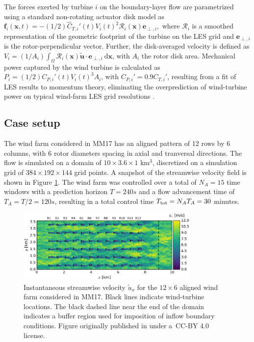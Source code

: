 \documentclass[wes, manuscript]{copernicus}
\newcommand{\bs}[1]{\boldsymbol{#1}}
\newcommand{\dx}{\text{d}\boldsymbol{x}}
\newcommand{\sint}{\int_{\Omega}}
\newcommand{\utilde}{\widetilde{\bs{u}}}
\newcommand{\R}{\mathscr{R}}
\newcommand{\eperpi}{\bs{e}_{\perp,i}}
\begin{document}
The forces exerted by turbine $i$ on the boundary-layer flow are parametrized using a standard non-rotating actuator disk model as
$	\bs{f}_i(\bs{x},t) = - (1/2) \widehat{C}_{T,i}'(t) V_i(t)^2 \R_i (\bs{x}) \eperpi,$
where $\R_i$ is a smoothed representation of the geometric footprint of the turbine on the LES grid and $\eperpi$ is the rotor-perpendicular vector. Further, the disk-averaged velocity is defined as $V_i = (1/A_i) \sint \R_i(\bs{x}) \utilde \cdot \eperpi ~\dx$, with $A_i$ the rotor disk area. Mechanical power captured by the wind turbine is calculated as $P_i = (1/2) C_{P,i}'(t) V_i(t)^3 A_i$, with $C_{P,i}' = 0.9 C_{T,i}'$, resulting from a fit of LES results to momentum theory, eliminating the overprediction of wind-turbine power on typical wind-farm LES grid resolutions \citep{munters2017optimal}.  

\subsection{Case setup}
The wind farm considered in MM17 has an aligned pattern of 12 rows by 6 columns, with 6 rotor diameters spacing in axial and tranversal directions. The flow is simulated on a domain of $10 \times 3.6 \times 1$ km$^3$, discretized on a simulation grid of $384 \times 192 \times 144$ grid points. A snapshot of the streamwise velocity field is shown in Figure \ref{fig:flowfield_MM17}. The wind farm was controlled over a total of $N_A = 15$ time windows with a prediction horizon $T = 240 s$ and a flow advancement time of $T_A = T/2 = 120 s$, resulting in a total control time $T_{\rm tot} = N_A T_A = 30$ minutes. 

\begin{figure}
	\includegraphics[width=0.8\textwidth]{flowfield_MM17}
	\caption{Instantaneous streamwise velocity $\widetilde{u}_x$ for the $12 \times 6$ aligned wind farm considered in MM17. Black lines indicate wind-turbine locations. The black dashed line near the end of the domain indicates a buffer region used for imposition of inflow boundary conditions. Figure originally published in \cite{munters2017optimal} under a~CC-BY 4.0 license.\label{fig:flowfield_MM17}}
\end{figure}
\end{document}
